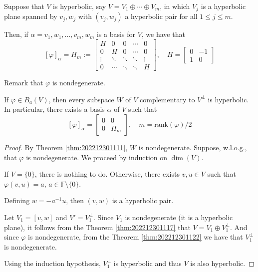 Suppose that $V$ is hyperbolic, say $V = V_1 \oplus \cdots \oplus V_m$, in which $V_j$ is a hyperbolic plane spanned by $v_j, w_j$ with $(v_j, w_j)$ a hyperbolic pair for all $1 \leq j \leq m$. 

Then, if $\alpha = v_1, w_1, \ldots, v_m, w_m$ is a basis for $V$, we have that 
\[
  [\varphi]_\alpha = H_m := \begin{bmatrix} 
    H & 0 & 0 & \cdots & 0 \\
    0 & H & 0 & \cdots & 0 \\
    \vdots & \ddots & \ddots & \ddots & \vdots \\
    0 & \cdots & \ddots & \ddots & H 
  \end{bmatrix},
  \quad 
  H = \begin{bmatrix}
    0 & -1 \\
    1 & 0 
  \end{bmatrix}
\]

Remark that $\varphi$ is nondegenerate. 

\begin{theorem}
  If $\varphi \in B_a(V)$, then every subspace $W$ of $V$ complementary to $V^\perp$ is hyperbolic. In particular, there exists a basis $\alpha$ of $V$ such that 
  \[
    [\varphi]_\alpha = \begin{bmatrix}
      0 & 0 \\
      0 & H_m
    \end{bmatrix}, \quad m = \text{rank}(\varphi)/2 
  \]
\end{theorem}

\begin{proof}
  By Theorem \ref{thm:202212301111}, $W$ is nondegenerate. Suppose, w.l.o.g., that $\varphi$ is nondegenerate. We proceed by induction on $\dim(V)$. 

  If $V = \{ 0 \}$, there is nothing to do. Otherwise, there exists $v,u \in V$ such that $\varphi(v,u) = a$, $a \in \mathbb{F} \setminus \{ 0 \}$. 

  Defining $w = -a^{-1} u$, then $(v,w)$ is a hyperbolic pair. 

  Let $V_1 = [v,w]$ and $V' = V_1^\perp$. Since $V_1$ is nondegenerate (it is a hyperbolic plane), it follows from the Theorem \ref{thm:202212301117} that $V = V_1 \oplus V_1^\perp$. And since $\varphi$ is nondegenerate, from the Theorem \ref{thm:202212301122} we have that $V_1^\perp$ is nondegenerate.

  Using the induction hypothesis, $V_1^\perp$ is hyperbolic and thus $V$ is also hyperbolic. 
\end{proof}

